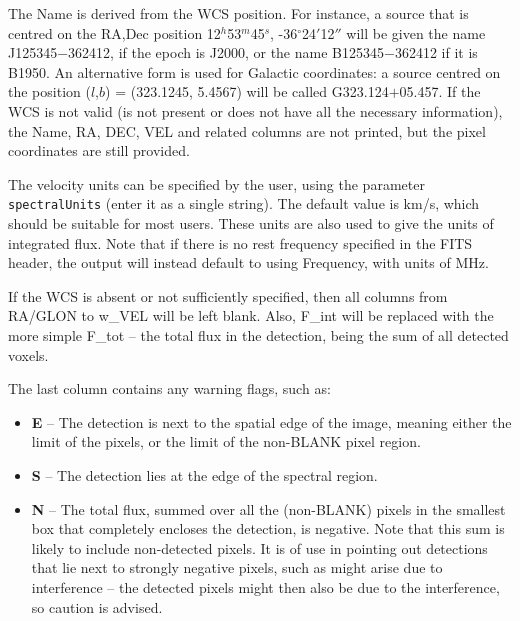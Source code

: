 The Name is derived from the WCS position. For instance, a source that
is centred on the RA,Dec position 12$^h$53$^m$45$^s$,
-36$^\circ$24$'$12$''$ will be given the name J125345$-$362412, if the
epoch is J2000, or the name B125345$-$362412 if it is B1950. An
alternative form is used for Galactic coordinates: a source centred on
the position ($l$,$b$) = (323.1245, 5.4567) will be called
G323.124$+$05.457. If the WCS is not valid (\ie is not present or does
not have all the necessary information), the Name, RA, DEC, VEL and
related columns are not printed, but the pixel coordinates are still
provided.

The velocity units can be specified by the user, using the parameter
\texttt{spectralUnits} (enter it as a single string). The default
value is km/s, which should be suitable for most users. These units
are also used to give the units of integrated flux. Note that if there
is no rest frequency specified in the FITS header, the \duchamp
output will instead default to using Frequency, with units of MHz.

If the WCS is absent or not sufficiently specified, then all columns
from RA/GLON to w\_VEL will be left blank. Also, F\_int will be
replaced with the more simple F\_tot -- the total flux in the
detection, being the sum of all detected voxels.

The last column contains any warning flags, such as:
\begin{itemize}
\item \textbf{E} -- The detection is next to the spatial edge of the image,
meaning either the limit of the pixels, or the limit of the non-BLANK
pixel region.
\item \textbf{S} -- The detection lies at the edge of the spectral region. 
\item \textbf{N} -- The total flux, summed over all the (non-BLANK)
pixels in the smallest box that completely encloses the detection, is
negative. Note that this sum is likely to include non-detected
pixels. It is of use in pointing out detections that lie next to
strongly negative pixels, such as might arise due to interference --
the detected pixels might then also be due to the interference, so
caution is advised.
\end{itemize}


